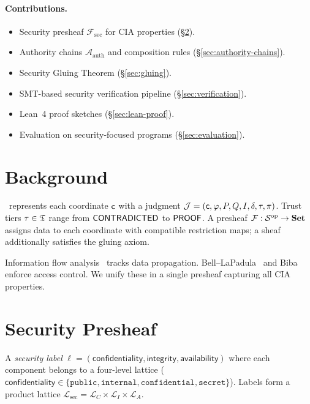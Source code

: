 \documentclass[11pt]{article}
\newcommand{\Confid}{\mathsf{confidentiality}}
\newcommand{\Integrity}{\mathsf{integrity}}
\newcommand{\Avail}{\mathsf{availability}}
\newcommand{\SecSheaf}{\mathcal{F}_{\mathrm{sec}}}
\newcommand{\AuthSheaf}{\mathcal{A}_{\mathrm{auth}}}
\begin{document}
\paragraph{Contributions.}
\begin{itemize}[noitemsep]
  \item Security presheaf $\SecSheaf$ for CIA properties
        (§\ref{sec:security-presheaf}).
  \item Authority chains $\AuthSheaf$ and composition rules
        (§\ref{sec:authority-chains}).
  \item Security Gluing Theorem (§\ref{sec:gluing}).
  \item SMT-based security verification pipeline
        (§\ref{sec:verification}).
  \item Lean~4 proof sketches (§\ref{sec:lean-proof}).
  \item Evaluation on \ppLXIXprogramCount{} security-focused programs
        (§\ref{sec:evaluation}).
\end{itemize}

\section{Background}\label{sec:background}

\JuGeo\ represents each coordinate $\mathsf{c}$ with a judgment
$\mathcal{J} = (\mathsf{c}, \varphi, P, Q, I, \delta, \tau, \pi)$.
Trust tiers $\tau \in \mathfrak{T}$ range from $\mathsf{CONTRADICTED}$ to $\mathsf{PROOF}$.
A presheaf $\mathcal{F} : \mathcal{S}^{\mathrm{op}} \to \mathbf{Set}$
assigns data to each coordinate with compatible restriction maps;
a sheaf additionally satisfies the gluing axiom.

Information flow analysis~\cite{Denning1976,Sabelfeld2003} tracks
data propagation.  Bell--LaPadula~\cite{BellLaPadula} and
Biba~\cite{Biba1977} enforce access control.  We unify these in a
single presheaf capturing all CIA properties.

\section{Security Presheaf}\label{sec:security-presheaf}

\begin{definition}\label{def:sec-label}
A \emph{security label} $\ell = (\Confid, \Integrity, \Avail)$ where
each component belongs to a four-level lattice (\eg $\Confid \in
\{\texttt{public}, \texttt{internal}, \texttt{confidential},
\texttt{secret}\}$).  Labels form a product lattice
$\mathcal{L}_{\mathrm{sec}} = \mathcal{L}_C \times \mathcal{L}_I
\times \mathcal{L}_A$.
\end{definition}
\end{document}
